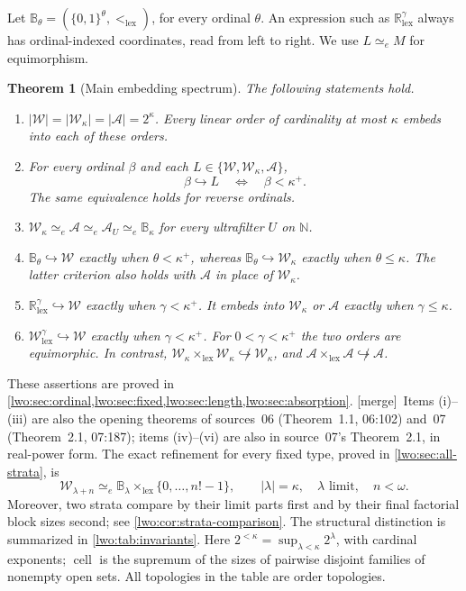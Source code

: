 \documentclass[11pt,a4paper]{article}
\newtheorem{theorem}{Theorem}[section]
\theoremstyle{definition}
\theoremstyle{remark}
\newcommand{\R}{\mathbb R}
\newcommand{\N}{\mathbb N}
\newcommand{\W}{\mathcal W}
\newcommand{\A}{\mathcal A}
\newcommand{\B}{\mathbb B}
\newcommand{\two}{\{0,1\}}
\newcommand{\lex}{\mathrm{lex}}
\newcommand{\cell}{\operatorname{cell}}
\newcommand{\emb}{\hookrightarrow}
\newcommand{\equi}{\mathrel{\simeq_{\!e}}}
\newcommand{\merge}{\textsf{[merge]}}
\begin{document}
Let $\B_\theta=(\two^\theta,<_{\lex})$, for every ordinal $\theta$.
An expression such as $\R^\gamma_{\lex}$ always has ordinal-indexed
coordinates, read from left to right. We use $L\equi M$ for equimorphism.

\begin{theorem}[Main embedding spectrum]\label{lwo:thm:main-spectrum}
The following statements hold.
\begin{enumerate}[label=(\roman*)]
\item $|\W|=|\W_\kappa|=|\A|=2^\kappa$. Every linear order of cardinality
at most $\kappa$ embeds into each of these orders.
\item For every ordinal $\beta$ and each
$L\in\{\W,\W_\kappa,\A\}$,
\[
                \beta\emb L\quad\Longleftrightarrow\quad\beta<\kappa^+.
\]
The same equivalence holds for reverse ordinals.
\item $\W_\kappa\equi\A\equi\A_U\equi\B_\kappa$ for every ultrafilter
$U$ on $\N$.
\item $\B_\theta\emb\W$ exactly when $\theta<\kappa^+$, whereas
$\B_\theta\emb\W_\kappa$ exactly when $\theta\leq\kappa$.
The latter criterion also holds with $\A$ in place of $\W_\kappa$.
\item $\R^\gamma_{\lex}\emb\W$ exactly when $\gamma<\kappa^+$.
It embeds into $\W_\kappa$ or $\A$ exactly when $\gamma\leq\kappa$.
\item $\W^\gamma_{\lex}\emb\W$ exactly when $\gamma<\kappa^+$.
For $0<\gamma<\kappa^+$ the two orders are equimorphic. In contrast,
$\W_\kappa\times_{\lex}\W_\kappa\not\emb\W_\kappa$, and
$\A\times_{\lex}\A\not\emb\A$.
\end{enumerate}
\end{theorem}

These assertions are proved in \cref{lwo:sec:ordinal,lwo:sec:fixed,lwo:sec:length,lwo:sec:absorption}.
\merge\ Items (i)--(iii) are also the opening theorems of sources~06
(Theorem~1.1, 06:102) and~07 (Theorem~2.1, 07:187); items (iv)--(vi) are
also in source~07's Theorem~2.1, in real-power form.
The exact refinement for every fixed type, proved in \cref{lwo:sec:all-strata}, is
\[
 \W_{\lambda+n}\equi\B_\lambda\times_{\lex}\{0,\ldots,n!-1\},
 \qquad |\lambda|=\kappa,\quad\lambda\text{ limit},\quad n<\omega.
\]
Moreover, two strata compare by their limit parts first and by their final
factorial block sizes second; see \cref{lwo:cor:strata-comparison}.
The structural distinction is summarized in \cref{lwo:tab:invariants}. Here
$2^{<\kappa}=\sup_{\lambda<\kappa}2^\lambda$, with cardinal exponents;
$\cell$ is the supremum of the sizes of pairwise disjoint families of
nonempty open sets. All topologies in the table are order topologies.
\end{document}
